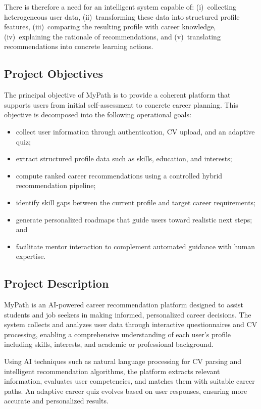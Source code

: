 \documentclass[12pt,a4paper]{article}
\begin{document}
There is therefore a need for an intelligent system capable of: (i)~collecting heterogeneous user data, (ii)~transforming these data into structured profile features, (iii)~comparing the resulting profile with career knowledge, (iv)~explaining the rationale of recommendations, and (v)~translating recommendations into concrete learning actions.

\subsection{Project Objectives}

The principal objective of MyPath is to provide a coherent platform that supports users from initial self-assessment to concrete career planning. This objective is decomposed into the following operational goals:

\begin{itemize}
  \item collect user information through authentication, CV upload, and an adaptive quiz;
  \item extract structured profile data such as skills, education, and interests;
  \item compute ranked career recommendations using a controlled hybrid recommendation pipeline;
  \item identify skill gaps between the current profile and target career requirements;
  \item generate personalized roadmaps that guide users toward realistic next steps; and
  \item facilitate mentor interaction to complement automated guidance with human expertise.
\end{itemize}

\subsection{Project Description}

MyPath is an AI-powered career recommendation platform designed to assist students and job seekers in making informed, personalized career decisions. The system collects and analyzes user data through interactive questionnaires and CV processing, enabling a comprehensive understanding of each user's profile including skills, interests, and academic or professional background.

Using AI techniques such as natural language processing for CV parsing and intelligent recommendation algorithms, the platform extracts relevant information, evaluates user competencies, and matches them with suitable career paths. An adaptive career quiz evolves based on user responses, ensuring more accurate and personalized results.
\end{document}
